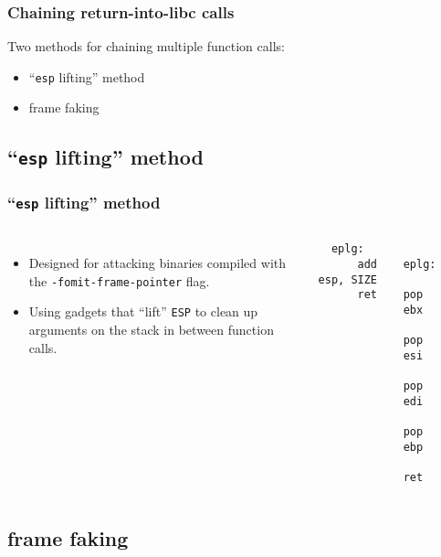 \documentclass[10pt]{beamer}
\begin{document}
\begin{frame}
  \frametitle{Chaining return-into-libc calls}
  Two methods for chaining multiple function calls:
  \begin{itemize}
    \item ``\texttt{esp} lifting'' method
    \item frame faking
  \end{itemize}
\end{frame}

\subsection{``\texttt{esp} lifting'' method}

\begin{frame}
  \frametitle{``\texttt{esp} lifting'' method}

  \begin{columns}[c]

  \begin{itemize}
    \item Designed for attacking binaries compiled with the
      \texttt{-fomit-frame-pointer} flag.

    \item Using gadgets that ``lift'' \texttt{ESP} to clean up arguments on the
      stack in between function calls.
  \end{itemize}

  \begin{lstlisting}
  eplg:
      add esp, SIZE
      ret
  \end{lstlisting}

  \begin{lstlisting}
  eplg:
      pop ebx
      pop esi
      pop edi
      pop ebp
      ret
  \end{lstlisting}


  \begin{drawstack}[scale=0.50]
    \startframe
    \cell{\dots}
  \end{drawstack}
  \end{columns}
\end{frame}

\subsection{frame faking}
\end{document}

